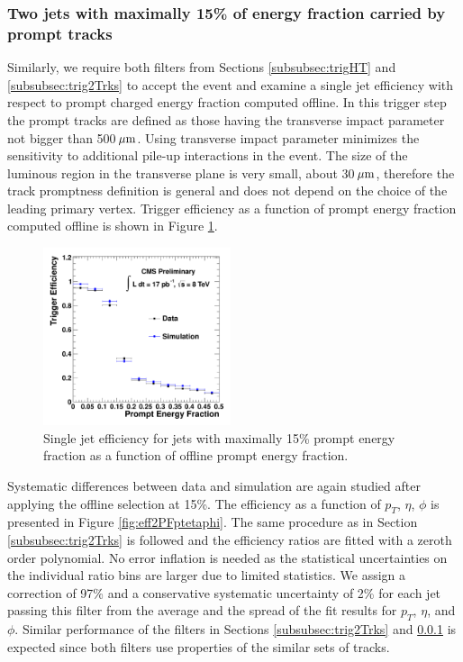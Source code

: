 \subsubsection{Two jets with maximally 15\% of energy fraction carried by prompt tracks}
\label{subsubsec:trig2PF}

Similarly, we require both filters from Sections \ref{subsubsec:trigHT} and \ref{subsubsec:trig2Trks} 
to accept the event and examine a single jet efficiency with respect to prompt charged energy
 fraction computed offline. In this trigger step the prompt tracks are defined
 as those having the transverse impact parameter not bigger than 500$\,\mu\text{m}$. 
Using transverse impact parameter
minimizes the sensitivity to additional pile-up interactions in the event. The size of the luminous region in 
the transverse plane is very small, about 30$\,\mu\text{m}$, therefore the track promptness definition is general
and does not depend on the choice of the leading primary vertex. 
Trigger efficiency as a function of prompt energy fraction computed offline is shown in Figure \ref{fig:eff2PF}.

\begin{figure}[htbp]
\centering
 \includegraphics[width=0.49\textwidth]{plots/trigger/effHT300_PF_PromptEnergyFrac.pdf}
\caption{Single jet efficiency for jets with maximally 15\% prompt energy fraction as a function of offline prompt energy fraction. \label{fig:eff2PF}}
\end{figure}     

Systematic differences between data and simulation are again studied after applying the offline selection at 15\%.
 The efficiency as a function of $p_T$, $\eta$, $\phi$ is presented in Figure \ref{fig:eff2PFptetaphi}. 
The same procedure as in Section 
\ref{subsubsec:trig2Trks} is followed and the efficiency ratios are fitted with a zeroth order polynomial.
 No error inflation is needed as the statistical uncertainties on the individual ratio bins are larger
due to limited statistics.
 We assign a correction of 97\% and a conservative systematic uncertainty of 2\% for
each jet passing this filter from the average and the spread of the fit results for $p_T$, $\eta$, and $\phi$.
Similar performance of the filters in Sections \ref{subsubsec:trig2Trks} and \ref{subsubsec:trig2PF} 
is expected since both filters use properties of the similar sets of tracks.

